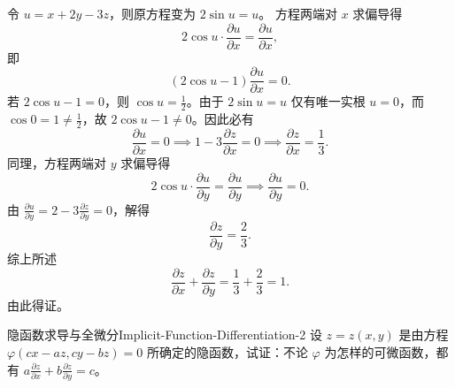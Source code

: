 \begin{myproof}
    令 $u = x + 2y - 3z$，则原方程变为 $2\sin u = u$。
    方程两端对 $x$ 求偏导得
    \begin{equation}
        2\cos u \cdot \frac{\partial u}{\partial x} = \frac{\partial u}{\partial x},
    \end{equation}
    即
    \begin{equation}
        (2\cos u - 1) \frac{\partial u}{\partial x} = 0.
    \end{equation}
    若 $2\cos u - 1 = 0$，则 $\cos u = \frac{1}{2}$。由于 $2\sin u = u$ 仅有唯一实根 $u = 0$，而 $\cos 0 = 1 \neq \frac{1}{2}$，故 $2\cos u - 1 \neq 0$。因此必有
    \begin{equation}
        \frac{\partial u}{\partial x} = 0 \implies 1 - 3 \frac{\partial z}{\partial x} = 0 \implies \frac{\partial z}{\partial x} = \frac{1}{3}.
    \end{equation}
    同理，方程两端对 $y$ 求偏导得
    \begin{equation}
        2\cos u \cdot \frac{\partial u}{\partial y} = \frac{\partial u}{\partial y} \implies \frac{\partial u}{\partial y} = 0.
    \end{equation}
    由 $\frac{\partial u}{\partial y} = 2 - 3 \frac{\partial z}{\partial y} = 0$，解得
    \begin{equation}
        \frac{\partial z}{\partial y} = \frac{2}{3}.
    \end{equation}
    综上所述
    \begin{equation}
        \frac{\partial z}{\partial x} + \frac{\partial z}{\partial y} = \frac{1}{3} + \frac{2}{3} = 1.
    \end{equation}
    由此得证。
\end{myproof}


\begin{problem}{隐函数求导与全微分}{Implicit-Function-Differentiation-2}
    设 $z = z(x, y)$ 是由方程 $\varphi(cx - az, cy - bz) = 0$ 所确定的隐函数，试证：不论 $\varphi$ 为怎样的可微函数，都有 $a\frac{\partial z}{\partial x} + b\frac{\partial z}{\partial y} = c$。
\end{problem}

